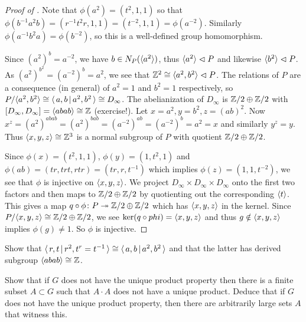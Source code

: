 \begin{proof}[Proof of ]
    Note that $\phi(a^2) = (t^2, 1, 1)$ so that $\phi(b^{-1} a^2 b) = (r^{-1} t^2 r, 1, 1) = (t^{-2}, 1, 1) = \phi(a^{-2})$.
    Similarly $\phi(a^{-1} b^2 a) = \phi(b^{-2})$, so this is a well-defined group homomorphism.

    Since $(a^2)^b = a^{-2}$, we have $b \in N_P(\langle a^2 \rangle)$, thus $\langle a^2 \rangle \vartriangleleft P$ and likewise $\langle b^2 \rangle \vartriangleleft P$.
    As $(a^2)^{b^2} = (a^{-2})^b = a^2$, we see that $\mathbb{Z}^2 \cong \langle a^2, b^2 \rangle \vartriangleleft P$.
    The relations of $P$ are a consequence (in general) of $a^2 = 1$ and $b^2 = 1$ respectively, so $P / \langle a^2, b^2 \rangle \cong \langle \, a, b \, | \, a^2, b^2 \, \rangle \cong D_\infty$.
    The abelianization of $D_\infty$ is $\mathbb{Z}/2 \oplus \mathbb{Z}/2$ with $[D_\infty, D_\infty] = \langle abab \rangle \cong \mathbb{Z}$ (exercise!).
    Let $x = a^2, y = b^2, z = (ab)^2$.
    Now $x^z = (a^2)^{abab} = (a^2)^{bab} = (a^{-2})^{ab} = (a^{-2})^b = a^2 = x$ and similarly $y^z = y$.
    Thus $\langle x, y, z \rangle \cong \mathbb{Z}^3$ is a normal subgroup of $P$ with quotient $\mathbb{Z}/2 \oplus \mathbb{Z}/2$.

    Since $\phi(x) = (t^2, 1, 1)$, $\phi(y) = (1, t^2, 1)$ and $\phi(ab) = (tr, trt, rtr) = (tr, r, t^{-1})$ which implies $\phi(z) = (1, 1, t^{-2})$, we see that $\phi$ is injective on $\langle x, y, z \rangle$.
    We project $D_\infty \times D_\infty \times D_\infty$ onto the first two factors and then maps to $\mathbb{Z}/2 \oplus \mathbb{Z}/2$ by quotienting out the corresponding $\langle t \rangle$.
    This gives a map $q \circ \phi \colon P \twoheadrightarrow \mathbb{Z}/2 \oplus \mathbb{Z}/2$ which has $\langle x, y, z \rangle$ in the kernel.
    Since $P / \langle x, y, z \rangle \cong \mathbb{Z}/2 \oplus \mathbb{Z}/2$, we see $\ker (q \circ phi) = \langle x, y, z \rangle$ and thus $g \notin \langle x, y, z \rangle$ implies $\phi(g) \neq 1$.
    So $\phi$ is injective.
\end{proof}

\begin{exercise}
    Show that $\langle \, r,t \, | \, r^2, t^r = t^{-1} \, \rangle \cong \langle \, a, b \, | \, a^2, b^2 \, \rangle$ and that the latter has derived subgroup $\langle abab \rangle \cong \mathbb{Z}$.
\end{exercise}

\begin{exercise}
    Show that if $G$ does not have the unique product property then there is a finite subset $A \subset G$ such that $A \cdot A$ does not have a unique product.
    Deduce that if $G$ does not have the unique product property, then there are arbitrarily large sets $A$ that witness this.
\end{exercise}

